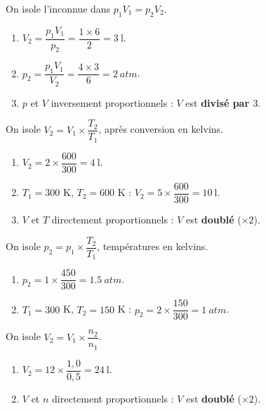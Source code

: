 \documentclass[11pt,a4paper]{article}
\begin{document}
\begin{corrige}
On isole l'inconnue dans $p_1 V_1 = p_2 V_2$.
\begin{enumerate}[label=\alph*)]
  \item $V_2=\dfrac{p_1 V_1}{p_2}=\dfrac{1\times6}{2}=\qty{3}{\litre}$.
  \item $p_2=\dfrac{p_1 V_1}{V_2}=\dfrac{4\times3}{6}=\qty{2}{atm}$.
  \item $p$ et $V$ inversement proportionnels : $V$ est \textbf{divisé par $3$}.
\end{enumerate}
\end{corrige}

\begin{corrige}
On isole $V_2=V_1\times\dfrac{T_2}{T_1}$, après conversion en kelvins.
\begin{enumerate}[label=\alph*)]
  \item $V_2=2\times\dfrac{600}{300}=\qty{4}{\litre}$.
  \item $T_1=300$ K, $T_2=600$ K : $V_2=5\times\dfrac{600}{300}=\qty{10}{\litre}$.
  \item $V$ et $T$ directement proportionnels : $V$ est \textbf{doublé} ($\times2$).
\end{enumerate}
\end{corrige}

\begin{corrige}
On isole $p_2=p_1\times\dfrac{T_2}{T_1}$, températures en kelvins.
\begin{enumerate}[label=\alph*)]
  \item $p_2=1\times\dfrac{450}{300}=\qty{1.5}{atm}$.
  \item $T_1=300$ K, $T_2=150$ K : $p_2=2\times\dfrac{150}{300}=\qty{1}{atm}$.
\end{enumerate}
\end{corrige}

\begin{corrige}
On isole $V_2=V_1\times\dfrac{n_2}{n_1}$.
\begin{enumerate}[label=\alph*)]
  \item $V_2=12\times\dfrac{1{,}0}{0{,}5}=\qty{24}{\litre}$.
  \item $V$ et $n$ directement proportionnels : $V$ est \textbf{doublé} ($\times2$).
\end{enumerate}
\end{corrige}
\end{document}
